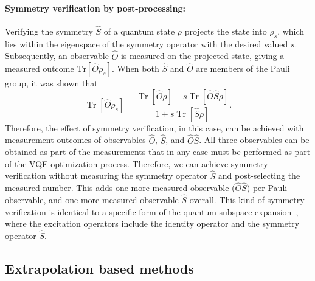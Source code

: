 \paragraph{Symmetry verification by post-processing:}
Verifying the symmetry $\hat{S}$ of a quantum state $\rho$ projects the state into $\rho_s$, which lies within the eigenspace of the symmetry operator with the desired valued $s$. Subsequently, an observable $\hat{O}$ is measured on the projected state,
giving a measured outcome $\mathrm{Tr}[\hat{O} \rho_s]$.
When both $\hat{S}$ and $\hat{O}$ are members of the Pauli group, it was shown \cite{bonet-monroigLowcostErrorMitigation2018} that 
\begin{equation}
    \operatorname{Tr}\left[\hat{O} \rho_{s}\right] =
    \frac{\operatorname{Tr}[\hat{O} \rho]+s \operatorname{Tr}[\hat{O} \hat{S} \rho]}{1+s \operatorname{Tr}[\hat{S} \rho]}.
\end{equation}
Therefore, the effect of symmetry verification, in this case, can be achieved with measurement outcomes of observables $\hat{O}$, $\hat{S}$, and $\hat{O}\hat{S}$. All three observables can be obtained as part of the measurements that in any case must be performed as part of the VQE optimization process.
Therefore, we can achieve symmetry verification without measuring the symmetry operator $\hat{S}$ and post-selecting the measured number. This adds one more measured observable ($\hat{O}\hat{S}$) per Pauli observable, and one more
measured observable $\hat{S}$ overall. This kind of symmetry verification is identical to a specific form of the quantum subspace expansion~\cite{bonet-monroigLowcostErrorMitigation2018}, where the excitation operators include the identity operator and the symmetry operator $\hat{S}$.

\subsection{Extrapolation based methods}
\label{sec:mit-extra}

